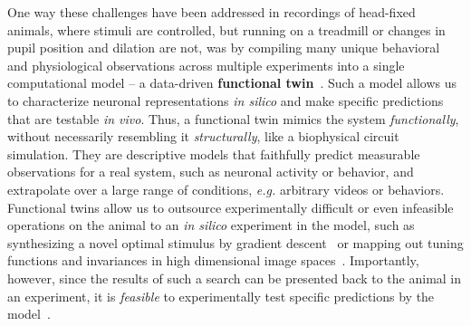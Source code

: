 \documentclass[B2,COG]{ercgrant}
\begin{document}
One way these challenges have been addressed in recordings of head-fixed animals, where stimuli are controlled, but running on a treadmill or changes in pupil position and dilation are not, was by compiling many unique behavioral and physiological observations across multiple experiments into a single computational model -- a data-driven \textbf{functional twin}~\parencite{Sinz2018-sk,Walker2019-yw,Franke2022-do}.
Such a model allows us to characterize neuronal representations \textit{in silico} and make specific predictions that are testable \textit{in vivo}. 
Thus, a functional twin mimics the system \textit{functionally}, without necessarily resembling it \textit{structurally}, like a biophysical circuit simulation.  
They are descriptive models that faithfully predict measurable observations for a real system, such as neuronal activity or behavior, and extrapolate over a large range of conditions, \textit{e.g.} arbitrary videos or behaviors. 
Functional twins allow us to outsource experimentally difficult or even infeasible operations on the animal to an \textit{in silico} experiment in the model, such as synthesizing a novel optimal stimulus by gradient descent~\parencite{Walker2019-yw} or mapping out tuning functions and invariances in high dimensional image spaces~\parencite{Baroni2022-fi}. 
Importantly, however, since the results of such a search can be presented back to the animal in an experiment, it is \textit{feasible} to experimentally test specific predictions by the model~\parencite{Walker2019-yw,Bashivan2019-ry}.
\end{document}
